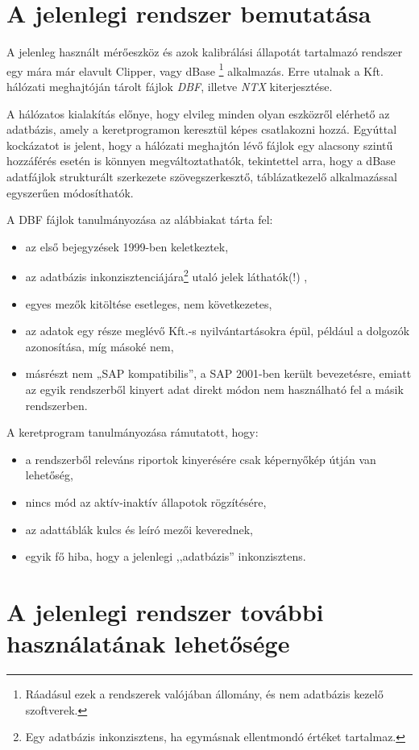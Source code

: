 \documentclass[a4paper,12pt]{report}
\begin{document}
\section{A jelenlegi rendszer bemutatása}
A jelenleg használt mérőeszköz és azok kalibrálási állapotát tartalmazó rendszer 
egy mára már elavult Clipper, vagy dBase \footnote{Ráadásul ezek a rendszerek valójában állomány, és nem adatbázis kezelő szoftverek.} alkalmazás. Erre utalnak a Kft.
hálózati meghajtóján tárolt fájlok \textit{DBF}, illetve \textit{NTX} 
kiterjesztése. 

A hálózatos kialakítás előnye, hogy elvileg minden olyan eszközről elérhető az
adatbázis, amely a keretprogramon keresztül képes csatlakozni hozzá. Egyúttal 
kockázatot is jelent, hogy a hálózati meghajtón lévő fájlok egy alacsony szintű 
hozzáférés esetén is könnyen megváltoztathatók, tekintettel arra, hogy a dBase 
adatfájlok strukturált szerkezete szövegszerkesztő, táblázatkezelő 
alkalmazással egyszerűen módosíthatók.

A DBF fájlok tanulmányozása az alábbiakat tárta fel:
\begin{itemize}
\item az első bejegyzések 1999-ben keletkeztek,
\item az adatbázis inkonzisztenciájára\footnote{Egy adatbázis inkonzisztens, ha egymásnak ellentmondó értéket tartalmaz.} utaló jelek láthatók(!) ,
\item egyes mezők kitöltése esetleges, nem következetes,
\item az adatok egy része meglévő Kft.-s nyilvántartásokra épül, például a
dolgozók azonosítása, míg másoké nem,
\item másrészt nem „SAP kompatibilis”, a SAP 2001-ben került bevezetésre, emiatt 
az egyik rendszerből kinyert adat direkt módon nem használható fel a másik 
rendszerben.
\end{itemize}
A keretprogram tanulmányozása rámutatott, hogy:
\begin{itemize}
\item a rendszerből releváns riportok kinyerésére csak képernyőkép útján van
lehetőség,
\item nincs mód az aktív-inaktív állapotok rögzítésére,
\item az adattáblák kulcs és leíró mezői keverednek,
\item egyik fő hiba, hogy a jelenlegi ,,adatbázis'' inkonzisztens.
\end{itemize}

\section{A jelenlegi rendszer további használatának lehetősége}
\end{document}

